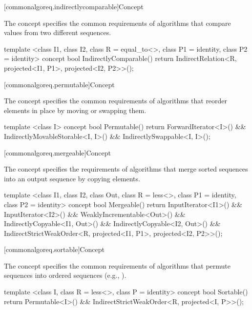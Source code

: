 [commonalgoreq.indirectlycomparable]{Concept }

\pnum
The  concept specifies the common requirements of algorithms that
compare values from two different sequences.

%
\begin{codeblock}
  template <class I1, class I2, class R = equal_to<>, class P1 = identity,
    class P2 = identity>
  concept bool IndirectlyComparable() {
    return IndirectRelation<R, projected<I1, P1>, projected<I2, P2>>();
  }
\end{codeblock}

[commonalgoreq.permutable]{Concept }

\pnum
The  concept specifies the common requirements of algorithms that reorder
elements in place by moving or swapping them.

%
\begin{codeblock}
  template <class I>
  concept bool Permutable() {
    return ForwardIterator<I>() &&
      IndirectlyMovableStorable<I, I>() &&
      IndirectlySwappable<I, I>();
  }
\end{codeblock}

[commonalgoreq.mergeable]{Concept }

\pnum
The  concept specifies the requirements of
algorithms that merge sorted sequences into an output sequence by copying elements.

%
\begin{codeblock}
  template <class I1, class I2, class Out,
      class R = less<>, class P1 = identity, class P2 = identity>
  concept bool Mergeable() {
    return InputIterator<I1>() &&
      InputIterator<I2>() &&
      WeaklyIncrementable<Out>() &&
      IndirectlyCopyable<I1, Out>() &&
      IndirectlyCopyable<I2, Out>() &&
      IndirectStrictWeakOrder<R, projected<I1, P1>, projected<I2, P2>>();
  }
\end{codeblock}

[commonalgoreq.sortable]{Concept }

\pnum
The  concept specifies the common requirements of algorithms that permute
sequences into ordered sequences (e.g., ).

%
\begin{codeblock}
  template <class I, class R = less<>, class P = identity>
  concept bool Sortable() {
    return Permutable<I>() &&
      IndirectStrictWeakOrder<R, projected<I, P>>();
  }
\end{codeblock}

